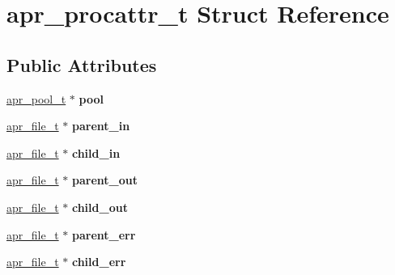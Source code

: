 \hypertarget{structapr__procattr__t}{}\section{apr\+\_\+procattr\+\_\+t Struct Reference}
\label{structapr__procattr__t}
\subsection*{Public Attributes}
\begin{DoxyCompactItemize}
\item 
\mbox{\label{structapr__procattr__t_a56669ec3556a929bdc2fcd4316ea3437}} 
\mbox{\hyperlink{group__apr__pools_gaf137f28edcf9a086cd6bc36c20d7cdfb}{apr\+\_\+pool\+\_\+t}} $\ast$ {\bfseries pool}
\item 
\mbox{\label{structapr__procattr__t_a61aaacffcf1a9e4f858a65a5bf4604d6}} 
\mbox{\hyperlink{structapr__file__t}{apr\+\_\+file\+\_\+t}} $\ast$ {\bfseries parent\+\_\+in}
\item 
\mbox{\label{structapr__procattr__t_abf67a29e0cd37f32c9901b1b29c8d337}} 
\mbox{\hyperlink{structapr__file__t}{apr\+\_\+file\+\_\+t}} $\ast$ {\bfseries child\+\_\+in}
\item 
\mbox{\label{structapr__procattr__t_a73bb8385ac4087051a5d15a5996beaab}} 
\mbox{\hyperlink{structapr__file__t}{apr\+\_\+file\+\_\+t}} $\ast$ {\bfseries parent\+\_\+out}
\item 
\mbox{\label{structapr__procattr__t_a8911ac8f9ee3084c9db7537c912f4dc8}} 
\mbox{\hyperlink{structapr__file__t}{apr\+\_\+file\+\_\+t}} $\ast$ {\bfseries child\+\_\+out}
\item 
\mbox{\label{structapr__procattr__t_af68000e7dee8bf82598d914b92f1f961}} 
\mbox{\hyperlink{structapr__file__t}{apr\+\_\+file\+\_\+t}} $\ast$ {\bfseries parent\+\_\+err}
\item 
\mbox{\label{structapr__procattr__t_a06d5eabe54ead0ae2517c65aec6c6a2a}} 
\mbox{\hyperlink{structapr__file__t}{apr\+\_\+file\+\_\+t}} $\ast$ {\bfseries child\+\_\+err}

\end{DoxyCompactItemize}
